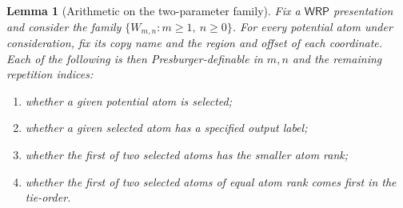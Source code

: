 \documentclass[10pt,a4paper]{amsart}
\newtheorem{lemma}{Lemma}
\newcommand{\WRP}{\mathsf{WRP}}
\begin{document}
\begin{lemma}[Arithmetic on the two-parameter family]
\label{lem:two-parameter-presburger}
Fix a $\WRP$ presentation and consider the family
$\{W_{m,n}:m\ge 1,\ n\ge 0\}$.  For every potential atom under consideration,
fix its copy name and the region and offset of each coordinate.  Each of the
following is then Presburger-definable in $m,n$ and the remaining repetition
indices:
\begin{enumerate}[label=(\alph*)]
\item whether a given potential atom is selected;
\item whether a given selected atom has a specified output label;
\item whether the first of two selected atoms has the smaller atom rank;
\item whether the first of two selected atoms of equal atom rank comes first in
the tie-order.
\end{enumerate}
\end{lemma}
\end{document}
